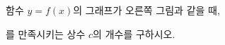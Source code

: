 \noindent\begin{minipage}[t]{0.58\linewidth}\vspace{0pt}\raggedright 함수 $y=f(x)$의 그래프가 오른쪽 그림과 같을 때,\par\smallskip\end{minipage}\hfill\begin{minipage}[t]{0.4\linewidth}\vspace{0pt}\centering \resizebox{\ifdim\width>\linewidth\linewidth\else\width\fi}{!}{}\end{minipage}\par
\noindent {}\par\smallskip\noindent 를 만족시키는 상수 $c$의 개수를 구하시오. 
